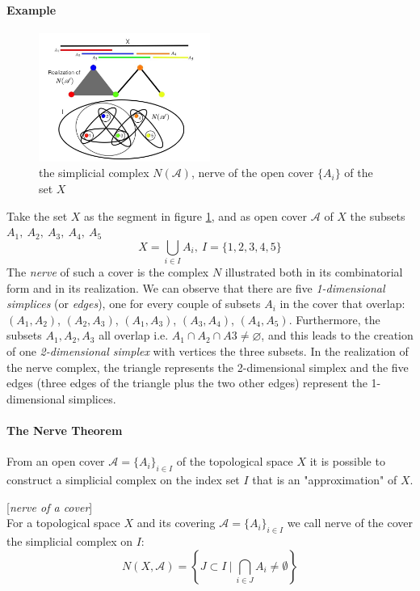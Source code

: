 \paragraph{Example}
\begin{figure}[htbp!] 
	\centering    
	\includegraphics[width=0.5\textwidth]{nerve.png}
	\caption{the simplicial complex $N(\mathcal{A})$, nerve of the open cover $\{A_i\}$ of the set $X$ }
	\label{fig:nerve}
\end{figure}

Take the set $X$ as the segment in figure \ref{fig:nerve}, and as open cover $\mathcal{A}$ of $X$ the subsets $A_1,\  A_2,\  A_3,\  A_4,\  A_5$ $$ X = \bigcup_{i \in I}A_i , \  I = \{1, 2, 3, 4, 5\}$$ The \textit{nerve} of such a cover is the complex $N$ illustrated both in its combinatorial form and in its realization. We can observe that there are five \textit{1-dimensional simplices} (or \textit{edges}), one for every couple of subsets $A_i$ in the cover that overlap: $(A_1, A_2)$, $(A_2, A_3)$, $(A_1, A_3)$, $(A_3, A_4)$, $(A_4, A_5)$. Furthermore, the subsets $A_1, A_2, A_3$ all overlap i.e. $A_1 \cap A_2 \cap A3 \neq \varnothing$, and this leads to the creation of one \textit{2-dimensional simplex} with vertices the three subsets. In the realization of the nerve complex, the triangle represents the 2-dimensional simplex and the five edges (three edges of the triangle plus the two other edges)  represent the 1-dimensional simplices.

\paragraph{The Nerve Theorem}
From an open cover $\mathcal A=\{A_i\}_{i\in I}$ of the topological space $X$ it is possible to construct  a simplicial complex on the index set $I$ that is an "approximation" of $X$. 

\begin{definition}{[\textit{nerve of a cover}]}\\
	For a topological space $X$ and its covering $\mathcal A =\{A_i\}_{i\in I}$ we call nerve of the cover the simplicial complex on $I$: $$N(X,\mathcal{A}) = \left\{J \subset I\ |\ \bigcap\limits_{i\in J} A_i \neq \emptyset\right\}$$ 
\end{definition}

